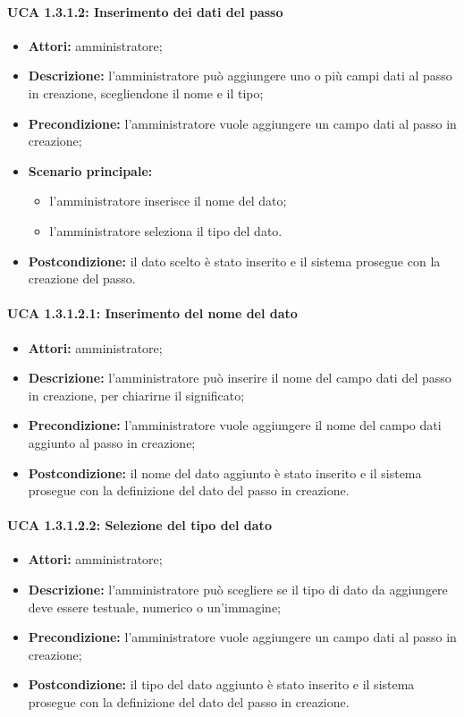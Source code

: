 \paragraph{UCA 1.3.1.2: Inserimento dei dati del passo}
\begin{itemize}
\item \textbf{Attori:} 
amministratore;
\item \textbf{Descrizione:} 
l'amministratore può aggiungere uno o più campi dati al passo in creazione, scegliendone il nome e il tipo;
\item \textbf{Precondizione:} 
l'amministratore vuole aggiungere un campo dati al passo in creazione;
\item \textbf{Scenario principale:} 
\begin{itemize}
\item l'amministratore inserisce il nome del dato;
\item l'amministratore seleziona il tipo del dato.
\end{itemize}
\item \textbf{Postcondizione:}
il dato scelto è stato inserito e il sistema prosegue con la creazione del passo.
\end{itemize}

\paragraph{UCA 1.3.1.2.1: Inserimento del nome del dato}
\begin{itemize}
\item \textbf{Attori:} 
amministratore;
\item \textbf{Descrizione:} 
l'amministratore può inserire il nome del campo dati del passo in creazione, per chiarirne il significato;
\item \textbf{Precondizione:} 
l'amministratore vuole aggiungere il nome del campo dati aggiunto al passo in creazione;
\item \textbf{Postcondizione:} 
il nome del dato aggiunto è stato inserito e il sistema prosegue con la definizione del dato del passo in creazione.
\end{itemize}

\paragraph{UCA 1.3.1.2.2: Selezione del tipo del dato}
\begin{itemize}
\item \textbf{Attori:} 
amministratore;
\item \textbf{Descrizione:} 
l'amministratore può scegliere se il tipo di dato da aggiungere deve essere testuale, numerico o un'immagine; 
\item \textbf{Precondizione:} 
l'amministratore vuole aggiungere un campo dati al passo in creazione;
\item \textbf{Postcondizione:} 
il tipo del dato aggiunto è stato inserito e il sistema prosegue con la definizione del dato del passo in creazione.
\end{itemize}

